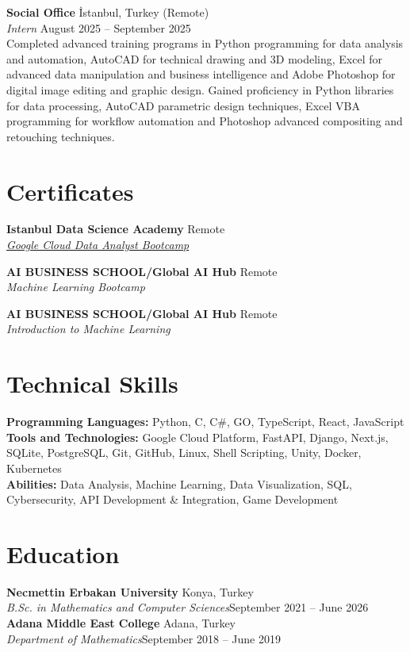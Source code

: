 \documentclass[10pt,a4paper]{extarticle}
\begin{document}
\vspace{5pt}
\noindent\textbf{Social Office} İstanbul, Turkey \hfill (Remote)\\
\textit{Intern} \hfill August 2025 -- September 2025\\
Completed advanced training programs in Python programming for data analysis and automation, AutoCAD for technical drawing and 3D modeling, Excel for advanced data manipulation and business intelligence and Adobe Photoshop for digital image editing and graphic design. Gained proficiency in Python libraries for data processing, AutoCAD parametric design techniques, Excel VBA programming for workflow automation and Photoshop advanced compositing and retouching techniques.

\vspace{9pt}

\section{Certificates}
\textbf{Istanbul Data Science Academy} \hfill Remote\\
\textit{\href{https://istdatascience.com/certificate/DABYO237.pdf}{Google Cloud Data Analyst Bootcamp}}

\vspace{5pt}
\noindent\textbf{AI BUSINESS SCHOOL/Global AI Hub} \hfill Remote\\
\textit{Machine Learning Bootcamp}

\vspace{5pt}
\noindent\textbf{AI BUSINESS SCHOOL/Global AI Hub} \hfill Remote\\
\textit{Introduction to Machine Learning}

\vspace{4pt}

\section{Technical Skills}
\textbf{Programming Languages:} Python, C, C\#, GO, TypeScript, React, JavaScript\\
\textbf{Tools and Technologies:} Google Cloud Platform, FastAPI, Django, Next.js, SQLite, PostgreSQL, Git, GitHub, Linux, Shell Scripting, Unity, Docker, Kubernetes\\
\textbf{Abilities:} Data Analysis, Machine Learning, Data Visualization, SQL, Cybersecurity, API Development \& Integration, Game Development

\vspace{4pt}

\section{Education}
\textbf{Necmettin Erbakan University} \hfill Konya, Turkey\\
\textit{B.Sc. in Mathematics and Computer Sciences}\hfill September 2021 -- June 2026 \\

\vspace{2pt}
\noindent\textbf{Adana Middle East College} \hfill Adana, Turkey\\
\textit{Department of Mathematics}\hfill September 2018 -- June 2019\\
\end{document}
